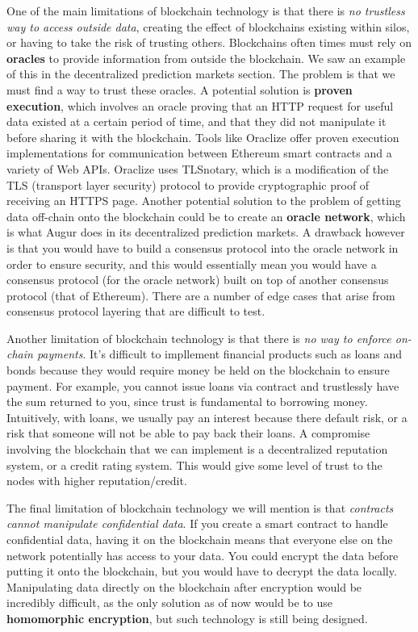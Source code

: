 \documentclass[full.tex]{subfiles}
\begin{document}
    One of the main limitations of blockchain technology is that there is \textit{no trustless way to access outside data}, creating the effect of blockchains existing within silos, or having to take the risk of trusting others. Blockchains often times must rely on \textbf{oracles} to provide information from outside the blockchain. We saw an example of this in the decentralized prediction markets section. The problem is that we must find a way to trust these oracles. A potential solution is \textbf{proven execution}, which involves an oracle proving that an HTTP request for useful data existed at a certain period of time, and that they did not manipulate it before sharing it with the blockchain. Tools like Oraclize offer proven execution implementations for communication between Ethereum smart contracts and a variety of Web APIs. Oraclize uses TLSnotary, which is a modification of the TLS (transport layer security) protocol to provide cryptographic proof of receiving an HTTPS page. Another potential solution to the problem of getting data off-chain onto the blockchain could be to create an \textbf{oracle network}, which is what Augur does in its decentralized prediction markets. A drawback however is that you would have to build a consensus protocol into the oracle network in order to ensure security, and this would essentially mean you would have a consensus protocol (for the oracle network) built on top of another consensus protocol (that of Ethereum). There are a number of edge cases that arise from consensus protocol layering that are difficult to test. 
    
    Another limitation of blockchain technology is that there is \textit{no way to enforce on-chain payments}. It's difficult to impllement financial products such as loans and bonds because they would require money be held on the blockchain to ensure payment. For example, you cannot issue loans via contract and trustlessly have the sum returned to you, since trust is fundamental to borrowing money. Intuitively, with loans, we usually pay an interest because there default risk, or a risk that someone will not be able to pay back their loans. A compromise involving the blockchain that we can implement is a decentralized reputation system, or a credit rating system. This would give some level of trust to the nodes with higher reputation/credit.
    
    The final limitation of blockchain technology we will mention is that \textit{contracts cannot manipulate confidential data}. If you create a smart contract to handle confidential data, having it on the blockchain means that everyone else on the network potentially has access to your data. You could encrypt the data before putting it onto the blockchain, but you would have to decrypt the data locally. Manipulating data directly on the blockchain after encryption would be incredibly difficult, as the only solution as of now would be to use \textbf{homomorphic encryption}, but such technology is still being designed.
    
\end{document}
